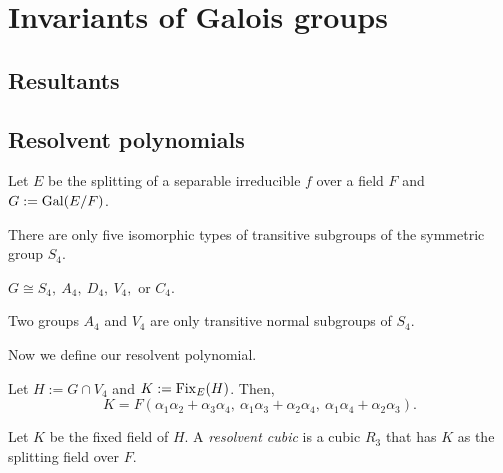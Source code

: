 \documentclass{../note}
\begin{document}
\chapter{Invariants of Galois groups}


\section{Resultants}

\section{Resolvent polynomials}
\begin{prb}
\end{prb}
\begin{prb}
\end{prb}
\begin{prb}
\end{prb}
\begin{prb}
\end{prb}


Let $E$ be the splitting of a separable irreducible $f$ over a field $F$ and $G:=\operatorname{Gal}(E/F)$.

\begin{thm}
There are only five isomorphic types of transitive subgroups of the symmetric group $S_4$.
\end{thm}
\begin{cor}
$G\cong S_4,\ A_4,\ D_4,\ V_4,\text{ or }C_4$.
\end{cor}
\begin{prop}
Two groups $A_4$ and $V_4$ are only transitive normal subgroups of $S_4$.
\end{prop}

Now we define our resolvent polynomial.
\begin{prop}
Let $H:=G\cap V_4$ and $K:=\operatorname{Fix}_E(H)$.
Then,
\[K=F(\alpha_1\alpha_2+\alpha_3\alpha_4,\ \alpha_1\alpha_3+\alpha_2\alpha_4,\ \alpha_1\alpha_4+\alpha_2\alpha_3).\]
\end{prop}
\begin{defn}
Let $K$ be the fixed field of $H$.
A \emph{resolvent cubic} is a cubic $R_3$ that has $K$ as the splitting field over $F$.
\end{defn}
\end{document}

